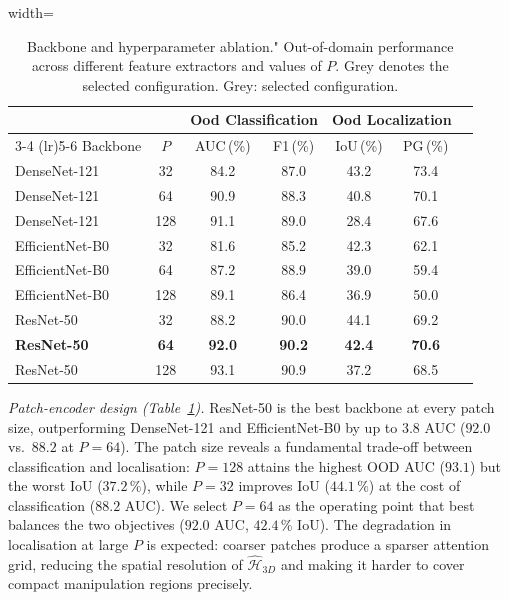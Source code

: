 \documentclass[sigconf, screen, review, anonymous]{acmart}
\begin{document}
\begin{table}[t]
    \centering
    \begin{adjustbox}{width=\columnwidth}
    \renewcommand{\arraystretch}{1}
    \begin{tabular}{l cc cccc}
        \toprule
        & & \multicolumn{2}{c}{Ood Classification} & \multicolumn{2}{c}{Ood Localization} \\
        \cmidrule(lr){3-4} \cmidrule(lr){5-6}
        Backbone & $P$ & AUC\,(\%) & F1\,(\%) & IoU\,(\%) & PG\,(\%)\\
        \midrule
        DenseNet-121    & 32  & 84.2 & 87.0 & 43.2 & 73.4 \\
        DenseNet-121    & 64  & 90.9 & 88.3 & 40.8 & 70.1 \\
        DenseNet-121    & 128 & 91.1 & 89.0 & 28.4 & 67.6 \\
        \midrule
        EfficientNet-B0 & 32  & 81.6 & 85.2 & 42.3 & 62.1 \\
        EfficientNet-B0 & 64  & 87.2 & 88.9 & 39.0 & 59.4 \\
        EfficientNet-B0 & 128 & 89.1 & 86.4 & 36.9 & 50.0 \\
        \midrule
        ResNet-50       & 32  & 88.2 & 90.0 & 44.1 & 69.2 \\
        \rowcolor{mygray}
        \textbf{ResNet-50} & \textbf{64} & \textbf{92.0} & \textbf{90.2} & \textbf{42.4} & \textbf{70.6} \\
        ResNet-50      & 128 & 93.1 & 90.9 & 37.2 & 68.5 \\
        \bottomrule
    \end{tabular}
    \end{adjustbox}
    \caption{%
     Backbone and hyperparameter ablation." Out-of-domain performance across different feature extractors and values of $P$. Grey denotes the selected configuration.        \colorbox{mygray}{Grey}: selected configuration.
    }
    \label{tab:abl_stage1}
\end{table}

\smallskip
\noindent\textit{Patch-encoder design (Table~\ref{tab:abl_stage1}).}
ResNet-50 is the best backbone at every patch size, outperforming DenseNet-121 and EfficientNet-B0 by up to $3.8$ AUC ($92.0$ vs.\ $88.2$ at $P\!=\!64$). The patch size reveals a fundamental trade-off between classification and localisation: $P\!=\!128$ attains the highest OOD AUC ($93.1$) but the worst IoU ($37.2\,\%$), while $P\!=\!32$ improves IoU ($44.1\,\%$) at the cost of classification ($88.2$ AUC). We select $P\!=\!64$ as the operating point that best balances the two objectives ($92.0$ AUC, $42.4\,\%$ IoU). The degradation in localisation at large $P$ is expected: coarser patches produce a sparser attention grid, reducing the spatial resolution of $\hat{\mathcal{H}}_{3D}$ and making it harder to cover compact manipulation regions precisely.
\end{document}
